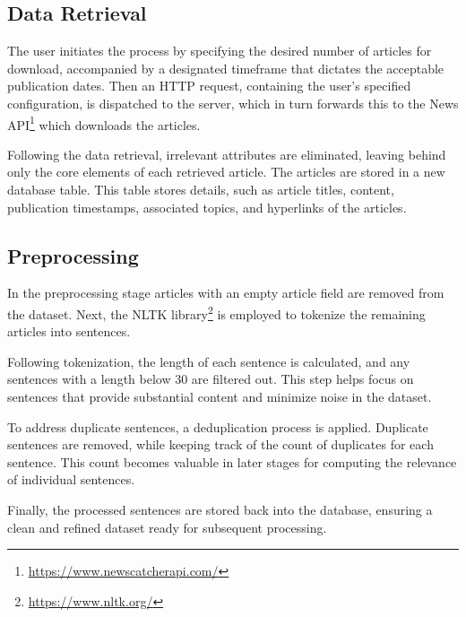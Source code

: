 \documentclass[12pt,oneside,bibtotoc,liststotoc]{scrbook}
\begin{document}
\subsection{Data Retrieval}
The user initiates the process by specifying the desired number of articles for download, accompanied by a designated timeframe that dictates the acceptable publication dates. Then an HTTP request, containing the user's specified configuration, is dispatched to the server, which in turn forwards this to the News API\footnote{\url{https://www.newscatcherapi.com/}} which downloads the articles.

Following the data retrieval, irrelevant attributes are eliminated, leaving behind only the core elements of each retrieved article. The articles are stored in a new database table. This table stores details, such as article titles, content, publication timestamps, associated topics, and hyperlinks of the articles.

\subsection{Preprocessing}
In the preprocessing stage articles with an empty article field are removed from the dataset. Next, the NLTK library\footnote{\url{https://www.nltk.org/}} is employed to tokenize the remaining articles into sentences.

Following tokenization, the length of each sentence is calculated, and any sentences with a length below 30 are filtered out. This step helps focus on sentences that provide substantial content and minimize noise in the dataset.

To address duplicate sentences, a deduplication process is applied. Duplicate sentences are removed, while keeping track of the count of duplicates for each sentence. This count becomes valuable in later stages for computing the relevance of individual sentences.

Finally, the processed sentences are stored back into the database, ensuring a clean and refined dataset ready for subsequent processing.
\end{document}
